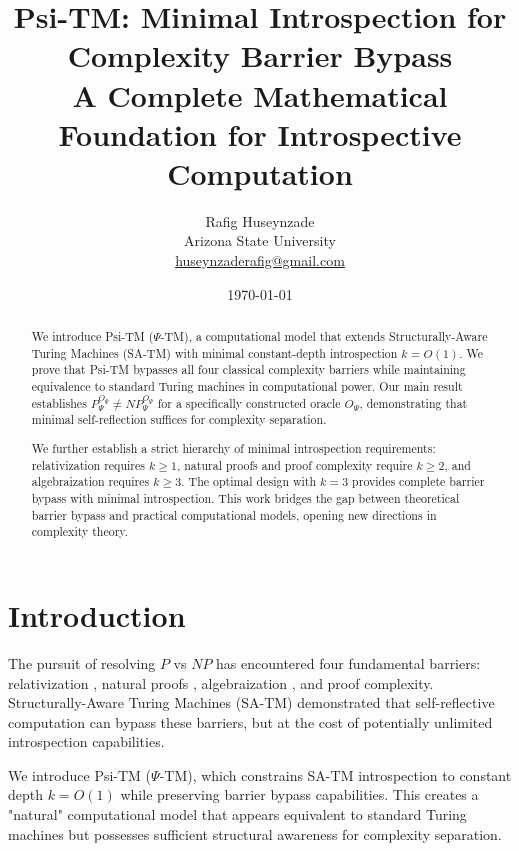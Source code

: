 \documentclass[11pt]{article}
\title{Psi-TM: Minimal Introspection for Complexity Barrier Bypass\\
\large{A Complete Mathematical Foundation for Introspective Computation}}
\author{Rafig Huseynzade\\
Arizona State University\\
\href{mailto:huseynzaderafig@gmail.com}{huseynzaderafig@gmail.com}}
\date{\today}
\theoremstyle{definition}
\begin{document}
\maketitle

\begin{abstract}
We introduce Psi-TM ($\Psi$-TM), a computational model that extends Structurally-Aware Turing Machines (SA-TM) with minimal constant-depth introspection $k = O(1)$. We prove that Psi-TM bypasses all four classical complexity barriers while maintaining equivalence to standard Turing machines in computational power. Our main result establishes $P^{O_\Psi}_\Psi \neq NP^{O_\Psi}_\Psi$ for a specifically constructed oracle $O_\Psi$, demonstrating that minimal self-reflection suffices for complexity separation. 

We further establish a strict hierarchy of minimal introspection requirements: relativization requires $k \geq 1$, natural proofs and proof complexity require $k \geq 2$, and algebraization requires $k \geq 3$. The optimal design with $k = 3$ provides complete barrier bypass with minimal introspection. This work bridges the gap between theoretical barrier bypass and practical computational models, opening new directions in complexity theory.
\end{abstract}

\tableofcontents
\newpage

\section{Introduction}

The pursuit of resolving $P$ vs $NP$ has encountered four fundamental barriers: relativization \cite{BGS75}, natural proofs \cite{RR97}, algebraization \cite{AW09}, and proof complexity. Structurally-Aware Turing Machines (SA-TM) \cite{SA-TM} demonstrated that self-reflective computation can bypass these barriers, but at the cost of potentially unlimited introspection capabilities.

We introduce Psi-TM ($\Psi$-TM), which constrains SA-TM introspection to constant depth $k = O(1)$ while preserving barrier bypass capabilities. This creates a "natural" computational model that appears equivalent to standard Turing machines but possesses sufficient structural awareness for complexity separation.
\end{document}
